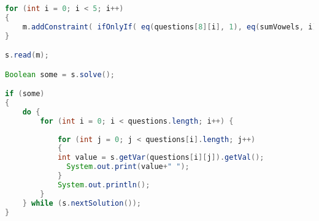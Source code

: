 \begin{lstlisting}[language=Java]
for (int i = 0; i < 5; i++)
{
	m.addConstraint( ifOnlyIf( eq(questions[8][i], 1), eq(sumVowels, i) ) );
}

s.read(m);

Boolean some = s.solve();

if (some)
{
    do {
        for (int i = 0; i < questions.length; i++) {
        	
        	for (int j = 0; j < questions[i].length; j++)
            {
          	int value = s.getVar(questions[i][j]).getVal();
              System.out.print(value+" ");
            }
            System.out.println();
        }
    } while (s.nextSolution());
}
\end{lstlisting}
